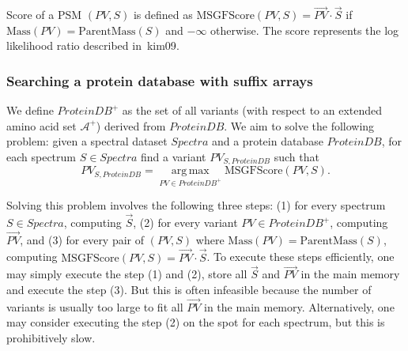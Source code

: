  Score  of
a PSM $(PV,S)$ is defined as $\mathrm{MSGFScore}(PV,S)=\vec{PV} \cdot \vec{S}$
   if $\textrm{Mass}(PV) = \textrm{ParentMass}(S)$
and $-\infty$ otherwise. The score represents the log likelihood
ratio described in~\cite{unv}{kim09}.


%

\subsubsection{Searching a protein database with suffix arrays}
\label{sec:DBSearch}

We define $ProteinDB^+$ as the set of all variants (with respect to an extended amino acid set $\mathcal{A}^+$) derived from $ProteinDB$.
We aim to solve the following problem: given a spectral dataset $Spectra$ and a protein database $ProteinDB$, for each spectrum $S \in Spectra$ find a variant $PV_{S,ProteinDB}$ such that
$$
PV_{S,ProteinDB} = \operatorname*{arg\,max}_{PV \in ProteinDB^+} \textrm{MSGFScore}(PV,S).
$$

\noindent Solving this problem involves the following three steps: 
(1) for every spectrum $S \in Spectra$, computing $\vec{S}$, 
(2) for every variant $PV \in ProteinDB^+$, computing $\vec{PV}$, 
and (3) for every pair of $(PV,S)$ where $\textrm{Mass}(PV)=\textrm{ParentMass}(S)$, computing $\mathrm{MSGFScore}(PV,S)=\vec{PV} \cdot \vec{S}$. 
To execute these steps efficiently, one may simply execute the step (1) and (2), store all $\vec{S}$ and $\vec{PV}$ in the main memory and execute the step (3).
But this is often infeasible because the number of variants is usually too large to fit all $\vec{PV}$ in the main memory.
Alternatively, one may consider executing the step (2) on the spot for each spectrum, but this is prohibitively slow.%

